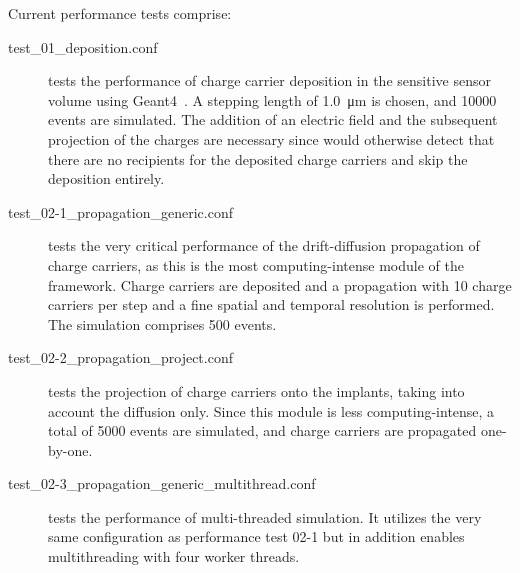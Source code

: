 Current performance tests comprise:

\begin{description}
    \item[test\_01\_deposition.conf] tests the performance of charge carrier deposition in the sensitive sensor volume using Geant4~\cite{geant4}. A stepping length of \SI{1.0}{\um} is chosen, and \num{10000} events are simulated. The addition of an electric field and the subsequent projection of the charges are necessary since \apsq would otherwise detect that there are no recipients for the deposited charge carriers and skip the deposition entirely.
    \item[test\_02-1\_propagation\_generic.conf] tests the very critical performance of the drift-diffusion propagation of charge carriers, as this is the most computing-intense module of the framework. Charge carriers are deposited and a propagation with 10 charge carriers per step and a fine spatial and temporal resolution is performed. The simulation comprises \num{500} events.
    \item[test\_02-2\_propagation\_project.conf] tests the projection of charge carriers onto the implants, taking into account the diffusion only. Since this module is less computing-intense, a total of \num{5000} events are simulated, and charge carriers are propagated one-by-one.
    \item[test\_02-3\_propagation\_generic\_multithread.conf] tests the performance of multi-threaded simulation. It utilizes the very same configuration as performance test 02-1 but in addition enables multithreading with four worker threads.
\end{description}
